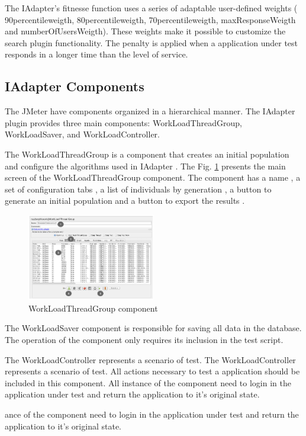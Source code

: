 The IAdapter's fitnesse function uses a series of adaptable user-defined weights ( 90percentileweigth, 80percentileweigth,  70percentileweigth, maxResponseWeigth and numberOfUsersWeigth). These weights make it possible to customize the search plugin functionality. The penalty is applied when a application under test responds in a longer time than the level of service.

\subsection{IAdapter Components}

The JMeter have components organized  in a hierarchical manner. The IAdapter plugin provides three main components: WorkLoadThreadGroup, WorkLoadSaver, and WorkLoadController.
 
The WorkLoadThreadGroup is a component that creates an initial population and configure the algorithms used in IAdapter . The Fig. \ref{fig:tela1iadapter} presents the main screen of the WorkLoadThreadGroup component. The component has a name , a set of configuration tabs , a list of individuals by generation , a button to generate an initial population  and a button to export the results .

\begin{figure}[h]
\includegraphics[width=0.5\textwidth]{./images/tela1iadapter.png}
\caption{WorkLoadThreadGroup component}
\label{fig:tela1iadapter}
\end{figure}

The WorkLoadSaver component is responsible for saving all data in the database. The operation of the component only requires its inclusion in the test script.

The WorkLoadController represents a scenario of test. The WorkLoadController represents a scenario of test. All actions necessary to test a application should be included in this component. All instance of the component need to login in the application under test and return the application to it's original state.


ance of the component need to login in the application under test and return the application to it's original state.